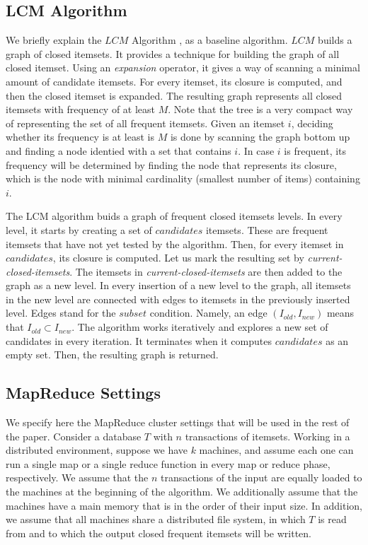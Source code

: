 \subsection{LCM Algorithm}
We briefly explain the $LCM$ Algorithm \cite{uno2003lcm}, as
a baseline algorithm. $LCM$ builds a graph of closed
itemsets. It provides a technique for building the graph of all closed itemset.
Using an \textit{expansion} operator, it gives a way of
scanning a minimal amount of candidate itemsets. For every itemset, its
closure is computed, and then the closed itemset is
expanded. The resulting graph represents all closed itemsets
with frequency of at least $M$. Note that the tree is a
very compact way of representing the set of all
frequent itemsets. Given an itemset $i$, deciding whether
its frequency is at least is $M$ is done by scanning the graph
bottom up and finding a node identied with a set that
contains $i$. In case $i$ is frequent, its frequency will
be determined by finding the node that represents its
closure, which is the node with minimal cardinality 
(smallest number of items) containing $i$. 

 The LCM algorithm buids a graph of frequent closed itemsets
 levels. In every level, it starts by creating a set of $candidates$ itemsets. These are
frequent itemsets that have not yet tested by the algorithm.
Then, for every itemset in $candidates$, its
closure is computed. Let us mark the resulting set by
\textit{current-closed-itemsets}. The itemsets in
\textit{current-closed-itemsets} are then added to the graph
as a new level. In every insertion of a new level to the graph, all itemsets in 
the new level are connected with edges to 
itemsets in the previously inserted level.
Edges stand for the $subset$ condition. Namely, an edge
$(I_{old}, I_{new})$ means that $I_{old} \subset I_{new}$.
The algorithm works iteratively and explores a new set of
candidates in every iteration. It terminates when it
computes $candidates$ as an empty set. Then, the resulting
graph is returned.

\subsection{MapReduce Settings}
We specify here the MapReduce cluster settings that will be
used in the rest of the paper. Consider a database $T$ with
$n$ transactions of itemsets. Working in a distributed environment, 
suppose we have $k$ machines, and assume each one can run a single map
or a single reduce function in every map or reduce phase,
respectively. We assume that the $n$ transactions of the
input are equally loaded to the machines at the beginning of the algorithm.
We additionally assume that the machines have a main memory
that is in the order of their input size. In addition, 
we assume that all machines share a distributed file system,
in which $T$ is read from and to which the output closed
frequent itemsets will be written.
